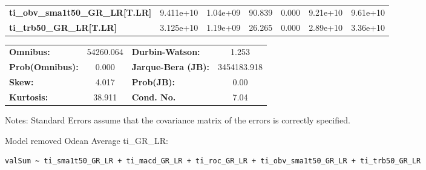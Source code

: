 \begin{center}
\begin{tabular}{lcccccc}
\textbf{ti\_obv\_sma1t50\_GR\_LR[T.LR]} &    9.411e+10  &     1.04e+09     &    90.839  &         0.000        &     9.21e+10    &     9.61e+10     \\
\textbf{ti\_trb50\_GR\_LR[T.LR]}        &    3.125e+10  &     1.19e+09     &    26.265  &         0.000        &     2.89e+10    &     3.36e+10     \\
\bottomrule
\end{tabular}
\begin{tabular}{lclc}
\textbf{Omnibus:}       & 54260.064 & \textbf{  Durbin-Watson:     } &      1.253   \\
\textbf{Prob(Omnibus):} &    0.000  & \textbf{  Jarque-Bera (JB):  } & 3454183.918  \\
\textbf{Skew:}          &    4.017  & \textbf{  Prob(JB):          } &       0.00   \\
\textbf{Kurtosis:}      &   38.911  & \textbf{  Cond. No.          } &       7.04   \\
\bottomrule
\end{tabular}
\end{center}

Notes: \newline
 [1] Standard Errors assume that the covariance matrix of the errors is correctly specified.

Model removed Odean Average ti_GR_LR: \begin{verbatim}valSum ~ ti_sma1t50_GR_LR + ti_macd_GR_LR + ti_roc_GR_LR + ti_obv_sma1t50_GR_LR + ti_trb50_GR_LR\end{verbatim}

